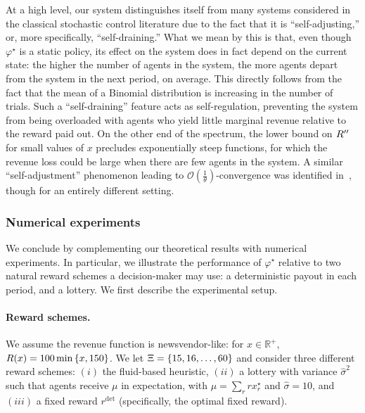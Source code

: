 \documentclass[12pt]{article}
\begin{document}
At a high level, our system distinguishes itself from {many} systems considered in the classical stochastic control literature due to the fact that it is ``self-adjusting,'' or, more specifically, ``self-draining.'' What we mean by this is that, even though $\varphi^\star$ is a static policy, its effect on the system does in fact depend on the current state: the higher the number of agents in the system, the more agents depart from the system in the next period, on average. This {directly} follows from the fact that the mean of a Binomial distribution is increasing in the number of trials. Such a ``self-draining'' feature acts as self-regulation, preventing the system from being overloaded with agents who yield little marginal revenue relative to the reward paid out. On the other end of the spectrum, the lower bound on $R''$ for small values of $x$ precludes exponentially steep functions, for which the revenue loss could be large when there are few agents in the system. A similar ``self-adjustment'' phenomenon leading to $\mathcal{O}\left(\frac1\theta\right)$-convergence was identified in~\cite{cao2020dynamic}, though for an entirely different setting.

\subsubsection{Numerical experiments} We conclude by complementing our theoretical results with numerical experiments. In particular, we illustrate the  performance of $\varphi^\star$ relative to two natural reward schemes a decision-maker may use: a deterministic payout in each period, and a lottery. We first describe the experimental setup.



\paragraph{{Reward} schemes.} We assume the revenue function is newsvendor-like: for $x \in \mathbb{R}^+$,  $R(x) = 100\min\left\{x, 150\right\}$. We let $\Xi = \{15, {16,}\ldots,60\}$ and consider three different reward schemes: $(i)$ %
the fluid-based heuristic, $(ii)$ {a lottery with variance $\widehat{\sigma}^2$ such that agents receive $\mu$ in expectation, with $\mu = \sum_r rx_r^\star$ and $\widehat{\sigma} = 10$,} and $(iii)$ a fixed reward $r^{\text{det}}$ (specifically, the optimal fixed reward).
\end{document}
